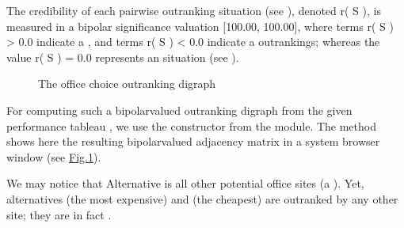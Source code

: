 \documentclass[a4paper,10pt,english]{sphinxhowto}
\let\sphinxpxdimen\pdfpxdimen\else\newdimen\sphinxpxdimen
\begin{document}
The credibility of each pairwise outranking situation (see ), denoted r( S ), is measured in a bipolar significance valuation {[}\sphinxhyphen{}100.00, 100.00{]}, where  terms r( S ) \textgreater{} 0.0 indicate a , and  terms r( S ) \textless{} 0.0 indicate a  outrankings; whereas the  value r( S ) = 0.0 represents an  situation (see ).

\begin{figure}[htbp]
\centering
\capstart

\noindent\sphinxincludegraphics[width=400\sphinxpxdimen]{{officeChoiceOutranking}.png}
\caption{The office choice outranking digraph}\label{\detokenize{tutorial:officechoiceoutranking}}\end{figure}

For computing such a bipolar\sphinxhyphen{}valued outranking digraph from the given performance tableau , we use the  constructor from the  module. The  method shows here the resulting bipolar\sphinxhyphen{}valued adjacency matrix in a system browser window (see \hyperref[\detokenize{tutorial:officechoiceoutranking}]{Fig.\@ \ref{\detokenize{tutorial:officechoiceoutranking}}}).

\begin{sphinxVerbatim}[commandchars=\\\{\},numbers=left,firstnumber=1,stepnumber=1]
   
  
\end{sphinxVerbatim}

We may notice that Alternative  is  all other potential office sites (a ). Yet, alternatives  (the most expensive) and  (the cheapest) are  outranked by any other site; they are in fact  .
\end{document}
